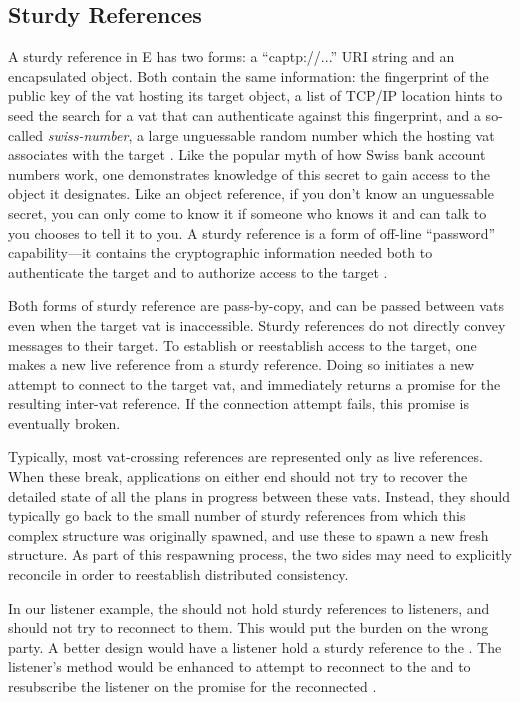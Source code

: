 \documentclass{llncs}
\begin{document}
\subsection{Sturdy References}

A sturdy reference in E has two forms: a ``captp://...'' URI string
and an encapsulated  object. Both contain the same
information: the fingerprint of the public key of the vat hosting its
target object, a list of TCP/IP location hints to seed the search for
a vat that can authenticate against this fingerprint, and a so-called
\emph{swiss-number}, a large unguessable random number which the
hosting vat associates with the target \cite{tyler:yurl}. Like the
popular myth of how Swiss bank account numbers work, one demonstrates
knowledge of this secret to gain access to the object it designates.
Like an object reference, if you don't know an unguessable secret, you
can only come to know it if someone who knows it and can talk to you
chooses to tell it to you. A sturdy reference is a form of off-line
``password'' capability---it contains the cryptographic information
needed both to authenticate the target and to authorize access to the
target \cite{jed:dccs}.

Both forms of sturdy reference are pass-by-copy, and can be passed
between vats even when the target vat is inaccessible. Sturdy
references do not directly convey messages to their target. To
establish or reestablish access to the target, one makes a new live
reference from a sturdy reference. Doing so initiates a new attempt to
connect to the target vat, and immediately returns a promise for the
resulting inter-vat reference. If the connection attempt fails, this
promise is eventually broken.

Typically, most vat-crossing references are represented only as live
references. When these break, applications on either end should not
try to recover the detailed state of all the plans in progress between
these vats. Instead, they should typically go back to the small number
of sturdy references from which this complex structure was originally
spawned, and use these to spawn a new fresh structure. As part of this
respawning process, the two sides may need to explicitly reconcile in
order to reestablish distributed consistency.

In our listener example, the  should not hold
sturdy references to listeners, and should not try to reconnect to
them. This would put the burden on the wrong party. A better design
would have a listener hold a sturdy reference to the
. The listener's 
method would be enhanced to attempt to reconnect to the
 and to resubscribe the listener on the promise for
the reconnected .
\end{document}
